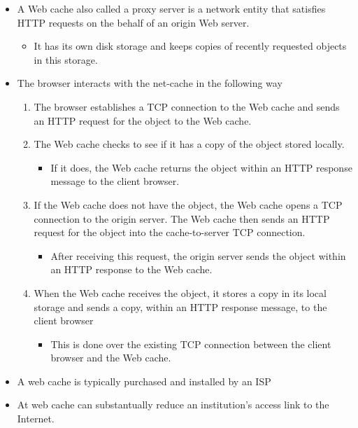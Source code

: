 \documentclass[11pt]{article}
\providecommand{\tightlist}{%
      \setlength{\itemsep}{0pt}\setlength{\parskip}{0pt}}
\begin{document}
\begin{itemize}
\tightlist
\item
  A Web cache also called a proxy server is a network entity that
  satisfies HTTP requests on the behalf of an origin Web server.

  \begin{itemize}
  \tightlist
  \item
    It has its own disk storage and keeps copies of recently requested
    objects in this storage.
  \end{itemize}
\item
  The browser interacts with the net-cache in the following way

  \begin{enumerate}
  \def\labelenumi{\arabic{enumi}.}
  \tightlist
  \item
    The browser establishes a TCP connection to the Web cache and sends
    an HTTP request for the object to the Web cache.
  \item
    The Web cache checks to see if it has a copy of the object stored
    locally.

    \begin{itemize}
    \tightlist
    \item
      If it does, the Web cache returns the object within an HTTP
      response message to the client browser.
    \end{itemize}
  \item
    If the Web cache does not have the object, the Web cache opens a TCP
    connection to the origin server. The Web cache then sends an HTTP
    request for the object into the cache-to-server TCP connection.

    \begin{itemize}
    \tightlist
    \item
      After receiving this request, the origin server sends the object
      within an HTTP response to the Web cache.
    \end{itemize}
  \item
    When the Web cache receives the object, it stores a copy in its
    local storage and sends a copy, within an HTTP response message, to
    the client browser

    \begin{itemize}
    \tightlist
    \item
      This is done over the existing TCP connection between the client
      browser and the Web cache.
    \end{itemize}
  \end{enumerate}
\item
  A web cache is typically purchased and installed by an ISP
\item
  At web cache can substantually reduce an institution's access link to
  the Internet.
\end{itemize}
\end{document}

